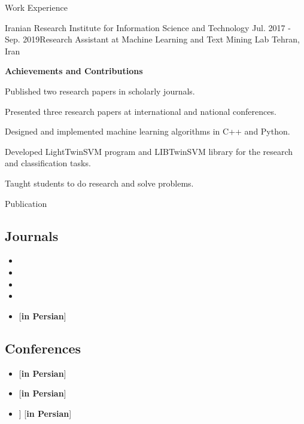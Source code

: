\documentclass{resume} %
\newcommand{\perspaper}{[\textbf{in Persian}]}
\begin{document}
\begin{rSection}{Work Experience}

\begin{rSubsection}{Iranian Research Institute for Information Science and Technology }{Jul. 2017 - Sep. 2019}{Research Assistant at Machine Learning and Text Mining Lab }{Tehran, Iran}
	
\textbf{Achievements and Contributions}
\item Published two research papers in scholarly journals.
\item Presented three research papers at international and national conferences.
\item Designed and implemented machine learning algorithms in C++ and Python.
\item Developed LightTwinSVM program and LIBTwinSVM library for the research and classification tasks.
\item Taught students to do research and solve problems.
\end{rSubsection}


\end{rSection}

\newpage
\begin{rSection}{Publication}
\subsection*{Journals}
\begin{itemize}
	\item {}
	\item {}
	\item {}
	\item {}
	\item {} \perspaper
\end{itemize}

\subsection*{Conferences}
\begin{itemize}
	\item {} \perspaper
	\item {} \perspaper
	\item {} ] \perspaper
\end{itemize}	
\end{rSection}
\end{document}
